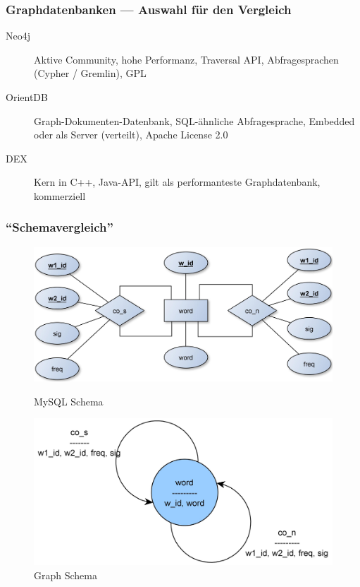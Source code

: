 \documentclass{beamer}
\begin{document}
\begin{frame}\frametitle{Graphdatenbanken --- Auswahl für den Vergleich}
	\begin{description}
		\item[Neo4j] Aktive Community, hohe Performanz, Traversal API, Abfragesprachen (Cypher / Gremlin), GPL
		\item[OrientDB] Graph-Dokumenten-Datenbank, SQL-ähnliche Abfragesprache, Embedded oder als Server (verteilt), Apache License 2.0
		\item[DEX] Kern in C++, Java-API, gilt als performanteste Graphdatenbank, kommerziell
	\end{description}
\end{frame}

\begin{frame}\frametitle{``Schemavergleich''}
\begin{figure}[ht]
\begin{minipage}[b]{0.45\linewidth}
\centering
\includegraphics[scale=0.055]{images/mysql_schema}
\caption{MySQL Schema}
\label{fig:mysql_schema}
\end{minipage}
\hspace{0.5cm}
\begin{minipage}[b]{0.45\linewidth}
\centering
\includegraphics[scale=0.075]{images/graph_schema.jpg}
\caption{Graph Schema}
\label{fig:graph_schema}
\end{minipage}
\end{figure}
\end{frame}
\end{document}
